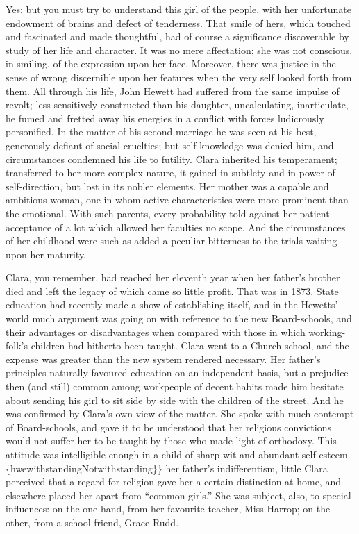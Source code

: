Yes; but you must try to understand this girl of the people, with her
unfortunate endowment of brains and defect of tenderness. That smile of
hers, which touched and fascinated and made thoughtful, had of course a
significance discoverable by study of her life and character. It was no
mere affectation; she was not conscious, in smiling, of the expression
upon her face. Moreover, there was justice in the sense of wrong
discernible upon her features when the very self looked forth from them.
All through his life, John {\protect\hypertarget{192}{}{}}Hewett had
suffered from the same impulse of revolt; less sensitively constructed
than his daughter, uncalculating, inarticulate, he fumed and fretted
away his energies in a conflict with forces ludicrously personified. In
the matter of his second marriage he was seen at his best, generously
defiant of social cruelties; but self-knowledge was denied him, and
circumstances condemned his life to futility. Clara inherited his
temperament; transferred to her more complex nature, it gained in
subtlety and in power of self-direction, but lost in its nobler
elements. Her mother was a capable and ambitious woman, one in whom
active characteristics were more prominent than the emotional. With such
parents, every probability told against her patient acceptance of a lot
which allowed her faculties no scope. And the circumstances of her
childhood were such as added a peculiar bitterness to the trials waiting
upon her maturity.

Clara, you remember, had reached her eleventh year when her father's
brother died {\protect\hypertarget{193}{}{}}and left the legacy of which
came so little profit. That was in 1873. State education had recently
made a show of establishing itself, and in the Hewetts' world much
argument was going on with reference to the new Board-schools, and their
advantages or disadvantages when compared with those in which
working-folk's children had hitherto been taught. Clara went to a
Church-school, and the expense was greater than the new system rendered
necessary. Her father's principles naturally favoured education on an
independent basis, but a prejudice then (and still) common among
workpeople of decent habits made him hesitate about sending his girl to
sit side by side with the children of the street. And he was confirmed
by Clara's own view of the matter. She spoke with much contempt of
Board-schools, and gave it to be understood that her religious
convictions would not suffer her to be taught by those who made light of
orthodoxy. This attitude was intelligible enough in a child of sharp wit
and abundant self-esteem.
{\protect\hypertarget{194}{}{}}\{hwe\textbar{}withstanding\textbar{}Notwithstanding\}\}
her father's indifferentism, little Clara perceived that a regard for
religion gave her a certain distinction at home, and elsewhere placed
her apart from ``common girls.'' She was subject, also, to special
influences: on the one hand, from her favourite teacher, Miss Harrop; on
the other, from a school-friend, Grace Rudd.

